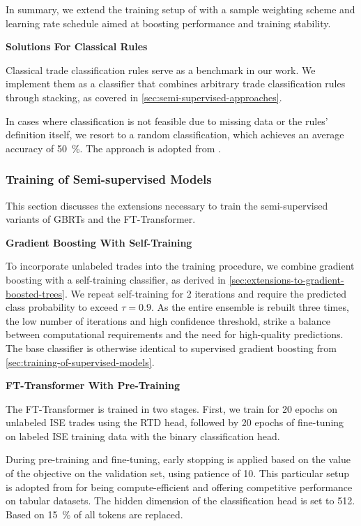 In summary, we extend the training setup of \textcite[][18937]{gorishniyRevisitingDeepLearning2021} with a sample weighting scheme and learning rate schedule aimed at boosting performance and training stability.

\vskip 1.3in

\textbf{Solutions For Classical Rules}

Classical trade classification rules serve as a benchmark in our work. We implement them as a classifier that combines arbitrary trade classification rules through stacking, as covered in \cref{sec:semi-supervised-approaches}.

In cases where classification is not feasible due to missing data or the rules' definition itself, we resort to a random classification, which achieves an average accuracy of \SI{50}{\percent}. The approach is adopted from \textcite[][887]{savickasInferringDirectionOption2003}.

\subsubsection{Training of Semi-supervised
    Models}\label{sec:training-of-semi-supervised-models}

This section discusses the extensions necessary to train the semi-supervised variants of \glspl{GBRT} and the FT-Transformer.

\textbf{Gradient Boosting With Self-Training}

To incorporate unlabeled trades into the training procedure, we combine gradient boosting with a self-training classifier, as derived in \cref{sec:extensions-to-gradient-boosted-trees}. We repeat self-training for 2 iterations and require the predicted class probability to exceed $\tau=0.9$. As the entire ensemble is rebuilt three times, the low number of iterations and high confidence threshold, strike a balance between computational requirements and the need for high-quality predictions. The base classifier is otherwise identical to supervised gradient boosting from \cref{sec:training-of-supervised-models}.

\textbf{FT-Transformer With Pre-Training}

The FT-Transformer is trained in two stages. First, we train for \num{20} epochs on unlabeled \gls{ISE} trades using the \gls{RTD} head, followed by \num{20} epochs of fine-tuning on labeled \gls{ISE} training data with the binary classification head.

During pre-training and fine-tuning, early stopping is applied based on the value of the objective on the validation set, using patience of \num{10}. This particular setup is adopted from \textcite[][15]{rubachevRevisitingPretrainingObjectives2022} for being compute-efficient and offering competitive performance on tabular datasets. The hidden dimension of the classification head is set to \num{512}. Based on \textcite[][3]{clarkElectraPretrainingText2020} \SI{15}{\percent} of all tokens are replaced.

